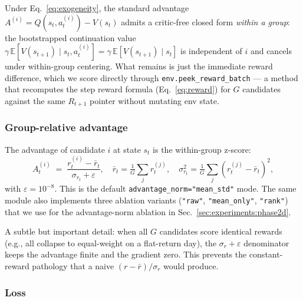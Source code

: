 Under Eq.~\ref{eq:exogeneity}, the standard advantage
$A^{(i)} = Q(s_t, a_t^{(i)}) - V(s_t)$ admits a critic-free closed form
\emph{within a group}: the bootstrapped continuation value
$\gamma\, \mathbb{E}[V(s_{t+1}) \mid s_t, a_t^{(i)}] = \gamma\, \mathbb{E}[V(s_{t+1}) \mid s_t]$
is independent of $i$ and cancels under within-group centering. What
remains is just the immediate reward difference, which we score directly
through \texttt{env.peek\_reward\_batch} --- a method that recomputes the
step reward formula (Eq.~\ref{eq:reward}) for $G$ candidates against the
same $R_{t+1}$ pointer without mutating env state.

\subsubsection{Group-relative advantage}

The advantage of candidate $i$ at state $s_t$ is the within-group z-score:
\begin{equation}
\label{eq:grpo-adv}
A_t^{(i)} \;=\; \frac{r_t^{(i)} - \bar{r}_t}{\sigma_{r_t} + \varepsilon},
\quad
\bar{r}_t = \tfrac{1}{G}\sum_j r_t^{(j)},
\quad
\sigma_{r_t}^2 = \tfrac{1}{G}\sum_j (r_t^{(j)} - \bar{r}_t)^2,
\end{equation}
with $\varepsilon = 10^{-8}$. This is the default
\verb|advantage_norm="mean_std"| mode. The same module also implements
three ablation variants (\verb|"raw"|, \verb|"mean_only"|, \verb|"rank"|)
that we use for the advantage-norm ablation in
Sec.~\ref{sec:experiments:phase2d}.

A subtle but important detail: when all $G$ candidates score identical
rewards (e.g., all collapse to equal-weight on a flat-return day), the
$\sigma_r{+}\varepsilon$ denominator keeps the advantage finite and the
gradient zero. This prevents the constant-reward pathology that a naive
$(r - \bar r)/\sigma_r$ would produce.

\subsubsection{Loss}

